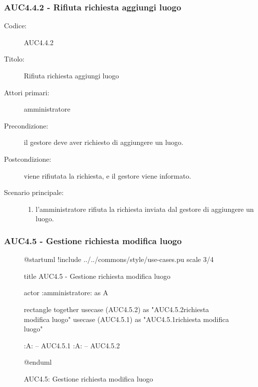 \documentclass[casi-duso]{subfiles}
\begin{document}
\subsubsection{AUC4.4.2 - Rifiuta richiesta aggiungi luogo}%
\label{subsub:AUC4.4.2}
\begin{description}
  \item[Codice:] AUC4.4.2
  \item[Titolo:] Rifiuta richiesta aggiungi luogo
  \item[Attori primari:] amministratore
  \item[Precondizione:] il gestore deve aver richiesto di aggiungere un luogo.
  \item[Postcondizione:] viene rifiutata la richiesta, e il gestore viene informato.
  \item[Scenario principale:]
  \begin{enumerate}
    \item l'amministratore rifiuta la richiesta inviata dal gestore di aggiungere un luogo.
  \end{enumerate}
\end{description}

\subsubsection{AUC4.5 - Gestione richiesta modifica luogo}%
\label{subsub:AUC4.5}

\begin{figure}[h!] 
  \centering 
  \begin{plantuml}
  @startuml
  !include ../../commons/style/use-cases.pu
  scale 3/4

  title AUC4.5 - Gestione richiesta modifica luogo

  actor :amministratore: as A

  rectangle {
    together {
      usecase (AUC4.5.2) as "AUC4.5.2\nRifiuta richiesta modifica luogo"
      usecase (AUC4.5.1) as "AUC4.5.1\nAccetta richiesta modifica luogo"
    }
  }

  :A: -- AUC4.5.1
  :A: -- AUC4.5.2

  @enduml
  \end{plantuml} 
  \caption{AUC4.5: Gestione richiesta modifica luogo} 
  \label{fig:auc } 
\end{figure}
\end{document}
